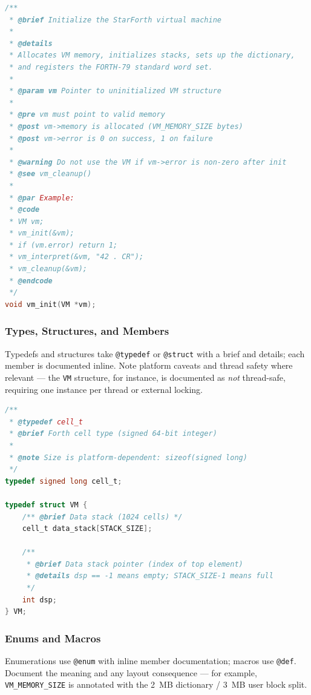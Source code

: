 \begin{lstlisting}[language=C]
/**
 * @brief Initialize the StarForth virtual machine
 *
 * @details
 * Allocates VM memory, initializes stacks, sets up the dictionary,
 * and registers the FORTH-79 standard word set.
 *
 * @param vm Pointer to uninitialized VM structure
 *
 * @pre vm must point to valid memory
 * @post vm->memory is allocated (VM_MEMORY_SIZE bytes)
 * @post vm->error is 0 on success, 1 on failure
 *
 * @warning Do not use the VM if vm->error is non-zero after init
 * @see vm_cleanup()
 *
 * @par Example:
 * @code
 * VM vm;
 * vm_init(&vm);
 * if (vm.error) return 1;
 * vm_interpret(&vm, "42 . CR");
 * vm_cleanup(&vm);
 * @endcode
 */
void vm_init(VM *vm);
\end{lstlisting}

\subsubsection{Types, Structures, and Members}

Typedefs and structures take \texttt{@typedef} or \texttt{@struct} with a brief
and details; each member is documented inline. Note platform caveats and thread
safety where relevant --- the \texttt{VM} structure, for instance, is documented
as \emph{not} thread-safe, requiring one instance per thread or external
locking.

\begin{lstlisting}[language=C]
/**
 * @typedef cell_t
 * @brief Forth cell type (signed 64-bit integer)
 *
 * @note Size is platform-dependent: sizeof(signed long)
 */
typedef signed long cell_t;

typedef struct VM {
    /** @brief Data stack (1024 cells) */
    cell_t data_stack[STACK_SIZE];

    /**
     * @brief Data stack pointer (index of top element)
     * @details dsp == -1 means empty; STACK_SIZE-1 means full
     */
    int dsp;
} VM;
\end{lstlisting}

\subsubsection{Enums and Macros}

Enumerations use \texttt{@enum} with inline member documentation; macros use
\texttt{@def}. Document the meaning and any layout consequence --- for example,
\texttt{VM\_MEMORY\_SIZE} is annotated with the 2~MB dictionary / 3~MB user
block split.

